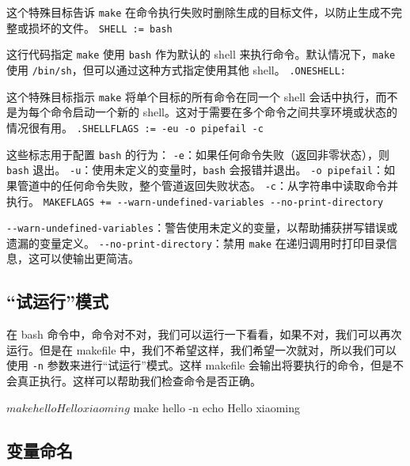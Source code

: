\documentclass[]{ctexbook}
\newenvironment{Shaded}{\begin{snugshade}}{\end{snugshade}}
\newcommand{\AttributeTok}[1]{\textcolor[rgb]{0.13,0.29,0.53}{#1}}
\newcommand{\BuiltInTok}[1]{#1}
\newcommand{\ExtensionTok}[1]{#1}
\newcommand{\NormalTok}[1]{#1}
\begin{document}
这个特殊目标告诉 \texttt{make} 在命令执行失败时删除生成的目标文件，以防止生成不完整或损坏的文件。
\texttt{SHELL\ :=\ bash}

这行代码指定 \texttt{make} 使用 \texttt{bash} 作为默认的 shell 来执行命令。默认情况下，\texttt{make} 使用 \texttt{/bin/sh}，但可以通过这种方式指定使用其他 shell。
\texttt{.ONESHELL:}

这个特殊目标指示 \texttt{make} 将单个目标的所有命令在同一个 shell 会话中执行，而不是为每个命令启动一个新的 shell。这对于需要在多个命令之间共享环境或状态的情况很有用。
\texttt{.SHELLFLAGS\ :=\ -eu\ -o\ pipefail\ -c}

这些标志用于配置 \texttt{bash} 的行为：
\texttt{-e}：如果任何命令失败（返回非零状态），则 \texttt{bash} 退出。
\texttt{-u}：使用未定义的变量时，\texttt{bash} 会报错并退出。
\texttt{-o\ pipefail}：如果管道中的任何命令失败，整个管道返回失败状态。
\texttt{-c}：从字符串中读取命令并执行。
\texttt{MAKEFLAGS\ +=\ -\/-warn-undefined-variables\ -\/-no-print-directory}

\texttt{-\/-warn-undefined-variables}：警告使用未定义的变量，以帮助捕获拼写错误或遗漏的变量定义。
\texttt{-\/-no-print-directory}：禁用 \texttt{make} 在递归调用时打印目录信息，这可以使输出更简洁。

\subsection{``试运行''模式}\label{ux8bd5ux8fd0ux884cux6a21ux5f0f}

在 bash 命令中，命令对不对，我们可以运行一下看看，如果不对，我们可以再次运行。但是在 makefile 中，我们不希望这样，我们希望一次就对，所以我们可以使用 \texttt{-n} 参数来进行``试运行''模式。这样 makefile 会输出将要执行的命令，但是不会真正执行。这样可以帮助我们检查命令是否正确。

\begin{Shaded}
\begin{Highlighting}[]
\ExtensionTok{$}\NormalTok{ make hello}
\ExtensionTok{Hello}\NormalTok{ xiaoming}

\ExtensionTok{$}\NormalTok{ make hello }\AttributeTok{{-}n}
\BuiltInTok{echo}\NormalTok{ Hello xiaoming}
\end{Highlighting}
\end{Shaded}

\subsection{变量命名}\label{ux53d8ux91cfux547dux540d}
\end{document}
